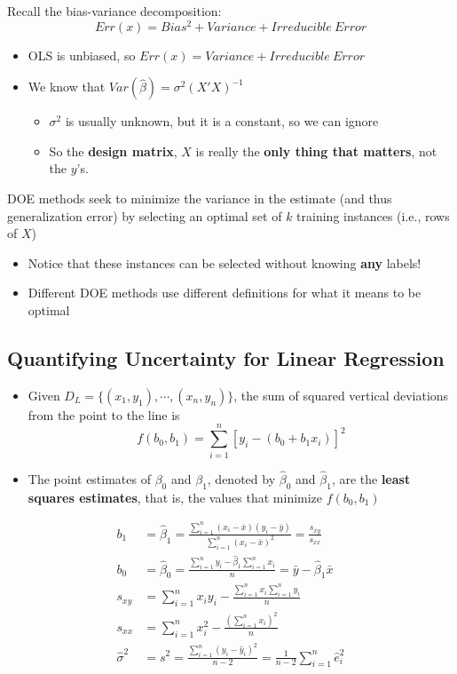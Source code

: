 \documentclass[10pt]{article}
\begin{document}
Recall the bias-variance decomposition:
\[Err(x) = Bias^2 + Variance + Irreducible~Error\]
\begin{itemize}
	\item OLS is unbiased, so $Err(x) = Variance + Irreducible~Error$
	\item We know that $Var(\hat{\beta}) = \sigma^2(X'X)^{-1}$
	\begin{itemize}
	    \item $\sigma^2$ is usually unknown, but it is a constant, so we can ignore 
        \item So the \textbf{design matrix}, $X$ is really the \textbf{only thing that matters}, not the $y$'s.
    \end{itemize}
\end{itemize}
DOE methods seek to minimize the variance in the estimate (and thus generalization error) by selecting an optimal set of $k$ training instances (i.e., rows of $X$)
\begin{itemize}
	\item Notice that these instances can be selected without knowing \textbf{any} labels!
	\item Different DOE methods use different definitions for what it means to be optimal
\end{itemize}

\subsection*{Quantifying Uncertainty for Linear Regression}
\begin{itemize}
	\item Given $D_L = \{(x_1, y_1), \cdots, (x_n, y_n)\}$, the sum of squared vertical deviations from the point to the line is
	\[f(b_0, b_1) = \sum_{i = 1}^n [y_i - (b_0 + b_1 x_i)]^2\]
    \item The point estimates of $\beta_0$ and $\beta_1$, denoted by $\hat{\beta}_0$ and $\hat{\beta}_1$, are the \textbf{least squares estimates}, that is, the values that minimize $f(b_0, b_1)$
\end{itemize}
\begin{align*}
    b_1 &= \hat{\beta}_1 = \frac{\sum_{i = 1}^n (x_i - \bar{x})(y_i - \bar{y})}{\sum_{i = 1}^n (x_i - \bar{x})^2} = \frac{s_{xy}}{s_{xx}} \\
    b_0 &= \hat{\beta}_0 = \frac{\sum_{i = 1}^n y_i - \hat{\beta}_1 \sum_{i = 1}^n x_i}{n} = \bar{y} - \hat{\beta}_1 \bar{x} \\
    s_{xy} &= \sum_{i = 1}^n x_i y_i - \frac{\sum_{i = 1}^n x_i \sum_{i = 1}^n y_i}{n} \\
    s_{xx} &= \sum_{i = 1}^n x_i^2 - \frac{\left(\sum_{i = 1}^n x_i\right)^2}{n} \\
    \hat{\sigma}^2 &= s^2 = \frac{\sum_{i = 1}^n (y_i - \hat{y}_i)^2}{n - 2} = \frac{1}{n - 2} \sum_{i = 1}^n \hat{e}_i^2
\end{align*}
\end{document}
